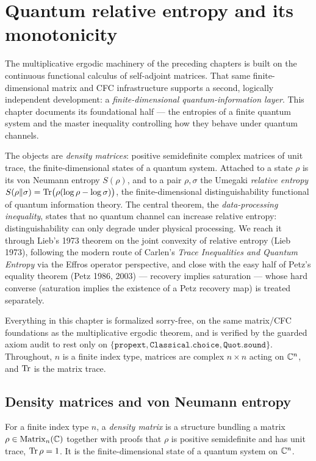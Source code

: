 \chapter{Quantum relative entropy and its monotonicity}
\label{chap:entropy}

The multiplicative ergodic machinery of the preceding chapters is built on the continuous
functional calculus of self-adjoint matrices. That same finite-dimensional matrix and CFC
infrastructure supports a second, logically independent development: a
\emph{finite-dimensional quantum-information layer}. This chapter documents its foundational
half --- the entropies of a finite quantum system and the master inequality controlling how they
behave under quantum channels.

The objects are \emph{density matrices}: positive semidefinite complex matrices of unit trace,
the finite-dimensional states of a quantum system. Attached to a state \(\rho\) is its von
Neumann entropy \(S(\rho)\), and to a pair \(\rho,\sigma\) the Umegaki \emph{relative entropy}
\(S(\rho\|\sigma) = \operatorname{Tr}\bigl(\rho(\log\rho-\log\sigma)\bigr)\), the finite-dimensional
distinguishability functional of quantum information theory. The central theorem, the
\emph{data-processing inequality}, states that no quantum channel can increase relative entropy:
distinguishability can only degrade under physical processing. We reach it through Lieb's 1973
theorem on the joint convexity of relative entropy (Lieb 1973), following the modern route of
Carlen's \emph{Trace Inequalities and Quantum Entropy} via the Effros operator perspective, and
close with the easy half of Petz's equality theorem (Petz 1986, 2003) --- recovery implies
saturation --- whose hard converse (saturation implies the existence of a Petz recovery map) is
treated separately.

Everything in this chapter is formalized sorry-free, on the same matrix/CFC foundations as the
multiplicative ergodic theorem, and is verified by the guarded axiom audit to rest only on
\(\{\texttt{propext}, \texttt{Classical.choice}, \texttt{Quot.sound}\}\). Throughout, \(n\) is a
finite index type, matrices are complex \(n\times n\) acting on \(\mathbb{C}^n\), and \(\operatorname{Tr}\) is the
matrix trace.

\section{Density matrices and von Neumann entropy}

\begin{definition}\label{DensityMatrix}
  \leanok
  For a finite index type \(n\), a \emph{density matrix} is a structure bundling a matrix
  \(\rho\in\operatorname{Matrix}_n(\mathbb{C})\) together with proofs that \(\rho\) is positive semidefinite and has
  unit trace, \(\operatorname{Tr}\rho = 1\). It is the finite-dimensional state of a quantum system on
  \(\mathbb{C}^n\).
\end{definition}

